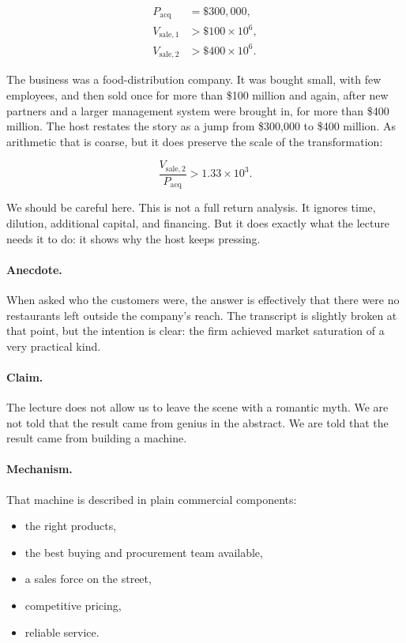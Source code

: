 \begin{align}
P_{\text{acq}} &= \$300{,}000,\\
V_{\text{sale},1} &> \$100 \times 10^6,\\
V_{\text{sale},2} &> \$400 \times 10^6.
\end{align}

The business was a food-distribution company. It was bought small, with few employees, and then sold once for more than \$100 million and again, after new partners and a larger management system were brought in, for more than \$400 million. The host restates the story as a jump from \$300{,}000 to \$400 million. As arithmetic that is coarse, but it does preserve the scale of the transformation:

\begin{equation}
\frac{V_{\text{sale},2}}{P_{\text{acq}}} > 1.33 \times 10^3.
\end{equation}

We should be careful here. This is not a full return analysis. It ignores time, dilution, additional capital, and financing. But it does exactly what the lecture needs it to do: it shows why the host keeps pressing.

\paragraph{Anecdote.}
When asked who the customers were, the answer is effectively that there were no restaurants left outside the company's reach. The transcript is slightly broken at that point, but the intention is clear: the firm achieved market saturation of a very practical kind.

\paragraph{Claim.}
The lecture does not allow us to leave the scene with a romantic myth. We are not told that the result came from genius in the abstract. We are told that the result came from building a machine.

\paragraph{Mechanism.}
That machine is described in plain commercial components:
\begin{itemize}
\item the right products,
\item the best buying and procurement team available,
\item a sales force on the street,
\item competitive pricing,
\item reliable service.
\end{itemize}

